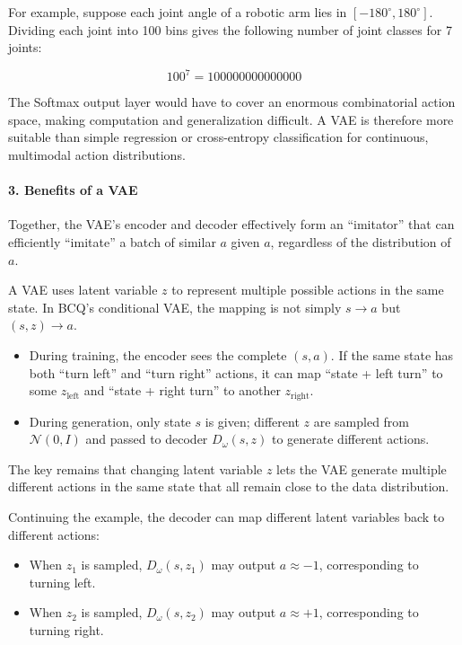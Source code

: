 For example, suppose each joint angle of a robotic arm lies in \([-180^{\circ},180^{\circ}]\). Dividing each joint into 100 bins gives the following number of joint classes for 7 joints:

\[
100^{7} = 100000000000000
\]

The Softmax output layer would have to cover an enormous combinatorial action space, making computation and generalization difficult. A VAE is therefore more suitable than simple regression or cross-entropy classification for continuous, multimodal action distributions.

\hypertarget{benefits-of-a-vae}{%
\paragraph{3. Benefits of a VAE}\label{benefits-of-a-vae}}

Together, the VAE's encoder and decoder effectively form an ``imitator'' that can efficiently ``imitate'' a batch of similar \(a\) given \(a\), regardless of the distribution of \(a\).

A VAE uses latent variable \(z\) to represent multiple possible actions in the same state. In BCQ's conditional VAE, the mapping is not simply \(s\to a\) but \((s,z)\to a\).

\begin{itemize}
\tightlist
\item
  During training, the encoder sees the complete \((s,a)\). If the same state has both ``turn left'' and ``turn right'' actions, it can map ``state + left turn'' to some \(z_{\mathrm{left}}\) and ``state + right turn'' to another \(z_{\mathrm{right}}\).
\item
  During generation, only state \(s\) is given; different \(z\) are sampled from \(\mathcal{N}(0,I)\) and passed to decoder \(D_\omega(s,z)\) to generate different actions.
\end{itemize}

The key remains that changing latent variable \(z\) lets the VAE generate multiple different actions in the same state that all remain close to the data distribution.

Continuing the example, the decoder can map different latent variables back to different actions:

\begin{itemize}
\tightlist
\item
  When \(z_1\) is sampled, \(D_\omega(s,z_1)\) may output \(a\approx -1\), corresponding to turning left.
\item
  When \(z_2\) is sampled, \(D_\omega(s,z_2)\) may output \(a\approx +1\), corresponding to turning right.
\end{itemize}

